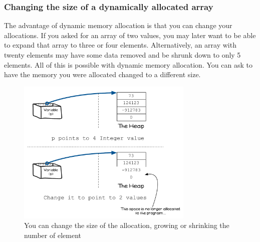 

\clearpage
\subsubsection{Changing the size of a dynamically allocated array} %
\label{ssub:changing_the_size_of_a_dynamically_allocated_array}

The advantage of dynamic memory allocation is that you can change your allocations. If you asked for an array of two values, you may later want to be able to expand that array to three or four elements. Alternatively, an array with twenty elements may have some data removed and be shrunk down to only 5 elements. All of this is possible with dynamic memory allocation. You can ask to have the memory you were allocated changed to a different size.

\begin{figure}[h]
   \centering
   \includegraphics[width=0.75\textwidth]{./topics/dynamic-memory/diagrams/AllocateMemory-Array-Resize} 
   \caption{You can change the size of the allocation, growing or shrinking the number of element}
   \label{fig:allocate-memory-array-resize}
\end{figure}

